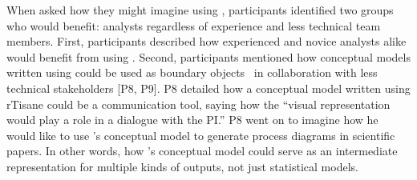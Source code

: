 
When asked how they might imagine using \rTisane, participants identified two
groups who would benefit: analysts regardless of experience and less technical
team members. First, participants described how experienced and novice analysts
alike would benefit from using \rTisane [P2, P4, P9, P10, P12]. Second,
participants mentioned how conceptual models written using \rTisane could be
used as boundary objects~\cite{star1989boundaryObjects} in collaboration with less technical
stakeholders [P8, P9]. P8 detailed how a conceptual model written using rTisane
could be a communication tool, saying how the ``visual representation would play
a role in a dialogue with the PI.'' P8 went on to imagine how he would like to
use \rTisane’s conceptual model to generate process diagrams in scientific
papers. In other words, how \rTisane’s conceptual model could serve as an
intermediate representation for multiple kinds of outputs, not just statistical
models. 


\begin{comment}
\theme{Analysts want to use \rTisane iteratively.}
Participants described their typical analysis approach without rTisane as
iterative. During the study, this looked like visualizing the data [P6, 10,
11, 12], assessing correlations between variables [P6, P10] to pick variables
for an initial statistical model, or starting with ``a full model first and
then trim down and compare'' [P11]. In the scaffold condition, analysts engaged
with the connection between their conceptual and statistical models [P2, 5,
12]. For example, P5 refined her conceptual model prior to implementing a
statistical model: ``Conceptual model matters because it gives something to
start with...how all of them have impacts...after have done analysis, look at
R-sq and p-value to interpret significance of these predictors.'' P5 also
grappled with how to interpret the statistical modeling results in light of her
conceptual model, especially since she PICK Background or Prediction as reason.
viewed the purpose of analysis to be able to predict income: ``Really don’t see
how statistical analysis helps us with why…'' She also explained how even though
she had a conceptual model, she did not feel she had the appropriate
background:``[if she had] more of a social science...background knowledge that
we have to dig deeper.'' While P5 could have interpreted her statistical models
in light of the conceptual model she authored, her observation about background
is nevertheless indicative of….
\end{comment}


